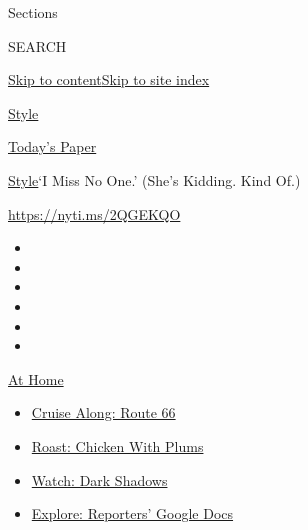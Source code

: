 Sections

SEARCH

\protect\hyperlink{site-content}{Skip to
content}\protect\hyperlink{site-index}{Skip to site index}

\href{https://www.nytimes3xbfgragh.onion/section/style}{Style}

\href{https://myaccount.nytimes3xbfgragh.onion/auth/login?response_type=cookie\&client_id=vi}{}

\href{https://www.nytimes3xbfgragh.onion/section/todayspaper}{Today's
Paper}

\href{/section/style}{Style}\textbar{}`I Miss No One.' (She's Kidding.
Kind Of.)

\url{https://nyti.ms/2QGEKQO}

\begin{itemize}
\item
\item
\item
\item
\item
\item
\end{itemize}

\href{https://www.nytimes3xbfgragh.onion/spotlight/at-home?action=click\&pgtype=Article\&state=default\&region=TOP_BANNER\&context=at_home_menu}{At
Home}

\begin{itemize}
\tightlist
\item
  \href{https://www.nytimes3xbfgragh.onion/2020/09/07/travel/route-66.html?action=click\&pgtype=Article\&state=default\&region=TOP_BANNER\&context=at_home_menu}{Cruise
  Along: Route 66}
\item
  \href{https://www.nytimes3xbfgragh.onion/2020/09/04/dining/sheet-pan-chicken.html?action=click\&pgtype=Article\&state=default\&region=TOP_BANNER\&context=at_home_menu}{Roast:
  Chicken With Plums}
\item
  \href{https://www.nytimes3xbfgragh.onion/2020/09/04/arts/television/dark-shadows-stream.html?action=click\&pgtype=Article\&state=default\&region=TOP_BANNER\&context=at_home_menu}{Watch:
  Dark Shadows}
\item
  \href{https://www.nytimes3xbfgragh.onion/interactive/2020/at-home/even-more-reporters-editors-diaries-lists-recommendations.html?action=click\&pgtype=Article\&state=default\&region=TOP_BANNER\&context=at_home_menu}{Explore:
  Reporters' Google Docs}
\end{itemize}

